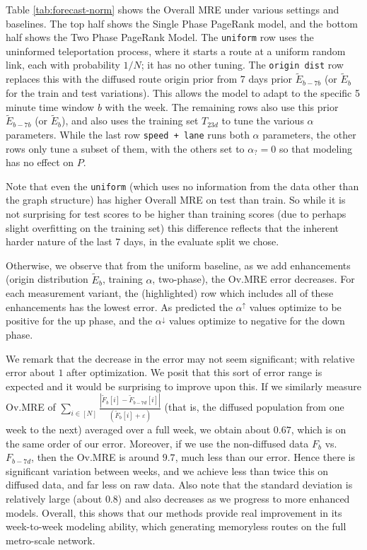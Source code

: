 \documentclass[sigconf, review]{acmart}
\begin{document}
Table \ref{tab:forecast-norm} shows the Overall MRE under various settings and baselines.  
The top half shows the Single Phase PageRank model, and the bottom half shows the Two Phase PageRank Model.  
The \texttt{uniform} row uses the uninformed teleportation process, where it starts a route at a uniform random link, each with probability $1/N$; it has no other tuning.  
The \texttt{origin dist} row replaces this with the diffused route origin prior from 7 days prior $\tilde E_{b-7b}$ (or $\tilde E_b$ for the train and test variations).  This allows the model to adapt to the specific 5 minute time window $b$ with the week.  The remaining rows also use this prior $\tilde E_{b-7b}$ (or $\tilde E_b$), and also uses the training set $T_{23d}$ to tune the various $\alpha$ parameters.  
While the last row \texttt{speed + lane} runs both $\alpha$ parameters, the other rows only tune a subset of them, with the others set to $\alpha_? = 0$ so that modeling has no effect on $P$.  

Note that even the \texttt{uniform} (which uses no information from the data other than the graph structure) has higher Overall MRE on test than train.  So while it is not surprising for test scores to be higher than training scores (due to perhaps slight overfitting on the training set) this difference reflects that the inherent harder nature of the last 7 days, in the evaluate split we chose.  

Otherwise, we observe that from the uniform baseline, as we add enhancements (origin distribution $\tilde E_b$, training $\alpha$, two-phase), the Ov.MRE error decreases.  For each measurement variant, the (\colorbox{gray!15}{highlighted}) row which includes all of these enhancements has the lowest error.  As predicted the $\alpha^\uparrow$ values optimize to be positive for the up phase, and the $\alpha^\downarrow$ values optimize to negative for the down phase.  


We remark that the decrease in the error may not seem significant; with relative error about $1$ after optimization.  We posit that this sort of error range is expected and it would be surprising to improve upon this.  If we similarly measure Ov.MRE of $\displaystyle\sum_{i\in [N]}\frac{|\tilde F_b[i] - \tilde F_{b - 7d}[i]|}{(\tilde F_b[i] + \varepsilon)}$ (that is, the diffused population from one week to the next) averaged over a full week, we obtain about $0.67$, which is on the same order of our error.  Moreover, if we use the non-diffused data $F_b$ vs. $F_{b-7d}$, then the Ov.MRE is around $9.7$, much less than our error.  Hence there is significant variation between weeks, and we achieve less than twice this on diffused data, and far less on raw data.  
Also note that the standard deviation is relatively large (about $0.8$) and also decreases as we progress to more enhanced models.  
Overall, this shows that our methods provide real improvement in its week-to-week modeling ability, which generating memoryless routes on the full metro-scale network.  
\end{document}
